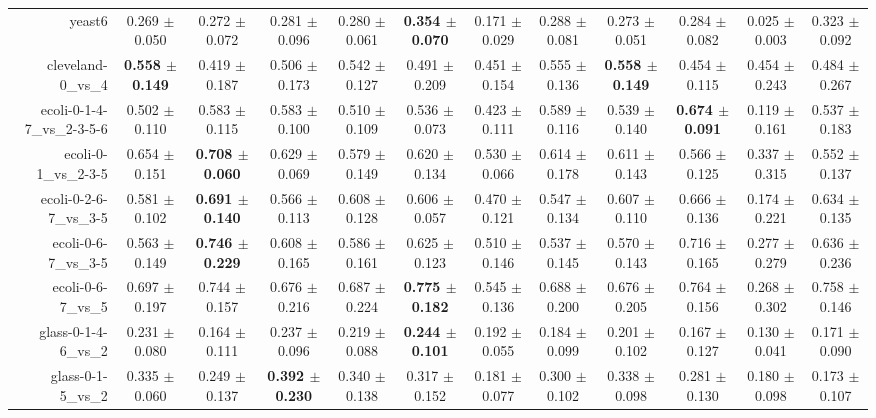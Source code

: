 \begin{table}[!ht]
{\begin{tabular}{r c c c c c c c c c c c}
yeast6 & 0.269 $\pm$ 0.050 & 0.272 $\pm$ 0.072 & 0.281 $\pm$ 0.096 & 0.280 $\pm$ 0.061 & \textbf{0.354 $\pm$ 0.070} & 0.171 $\pm$ 0.029 & 0.288 $\pm$ 0.081 & 0.273 $\pm$ 0.051 & 0.284 $\pm$ 0.082 & 0.025 $\pm$ 0.003 & 0.323 $\pm$ 0.092 \\
cleveland-0\_vs\_4 & \textbf{0.558 $\pm$ 0.149} & 0.419 $\pm$ 0.187 & 0.506 $\pm$ 0.173 & 0.542 $\pm$ 0.127 & 0.491 $\pm$ 0.209 & 0.451 $\pm$ 0.154 & 0.555 $\pm$ 0.136 & \textbf{0.558 $\pm$ 0.149} & 0.454 $\pm$ 0.115 & 0.454 $\pm$ 0.243 & 0.484 $\pm$ 0.267 \\
ecoli-0-1-4-7\_vs\_2-3-5-6 & 0.502 $\pm$ 0.110 & 0.583 $\pm$ 0.115 & 0.583 $\pm$ 0.100 & 0.510 $\pm$ 0.109 & 0.536 $\pm$ 0.073 & 0.423 $\pm$ 0.111 & 0.589 $\pm$ 0.116 & 0.539 $\pm$ 0.140 & \textbf{0.674 $\pm$ 0.091} & 0.119 $\pm$ 0.161 & 0.537 $\pm$ 0.183 \\
ecoli-0-1\_vs\_2-3-5 & 0.654 $\pm$ 0.151 & \textbf{0.708 $\pm$ 0.060} & 0.629 $\pm$ 0.069 & 0.579 $\pm$ 0.149 & 0.620 $\pm$ 0.134 & 0.530 $\pm$ 0.066 & 0.614 $\pm$ 0.178 & 0.611 $\pm$ 0.143 & 0.566 $\pm$ 0.125 & 0.337 $\pm$ 0.315 & 0.552 $\pm$ 0.137 \\
ecoli-0-2-6-7\_vs\_3-5 & 0.581 $\pm$ 0.102 & \textbf{0.691 $\pm$ 0.140} & 0.566 $\pm$ 0.113 & 0.608 $\pm$ 0.128 & 0.606 $\pm$ 0.057 & 0.470 $\pm$ 0.121 & 0.547 $\pm$ 0.134 & 0.607 $\pm$ 0.110 & 0.666 $\pm$ 0.136 & 0.174 $\pm$ 0.221 & 0.634 $\pm$ 0.135 \\
ecoli-0-6-7\_vs\_3-5 & 0.563 $\pm$ 0.149 & \textbf{0.746 $\pm$ 0.229} & 0.608 $\pm$ 0.165 & 0.586 $\pm$ 0.161 & 0.625 $\pm$ 0.123 & 0.510 $\pm$ 0.146 & 0.537 $\pm$ 0.145 & 0.570 $\pm$ 0.143 & 0.716 $\pm$ 0.165 & 0.277 $\pm$ 0.279 & 0.636 $\pm$ 0.236 \\
ecoli-0-6-7\_vs\_5 & 0.697 $\pm$ 0.197 & 0.744 $\pm$ 0.157 & 0.676 $\pm$ 0.216 & 0.687 $\pm$ 0.224 & \textbf{0.775 $\pm$ 0.182} & 0.545 $\pm$ 0.136 & 0.688 $\pm$ 0.200 & 0.676 $\pm$ 0.205 & 0.764 $\pm$ 0.156 & 0.268 $\pm$ 0.302 & 0.758 $\pm$ 0.146 \\
glass-0-1-4-6\_vs\_2 & 0.231 $\pm$ 0.080 & 0.164 $\pm$ 0.111 & 0.237 $\pm$ 0.096 & 0.219 $\pm$ 0.088 & \textbf{0.244 $\pm$ 0.101} & 0.192 $\pm$ 0.055 & 0.184 $\pm$ 0.099 & 0.201 $\pm$ 0.102 & 0.167 $\pm$ 0.127 & 0.130 $\pm$ 0.041 & 0.171 $\pm$ 0.090 \\
glass-0-1-5\_vs\_2 & 0.335 $\pm$ 0.060 & 0.249 $\pm$ 0.137 & \textbf{0.392 $\pm$ 0.230} & 0.340 $\pm$ 0.138 & 0.317 $\pm$ 0.152 & 0.181 $\pm$ 0.077 & 0.300 $\pm$ 0.102 & 0.338 $\pm$ 0.098 & 0.281 $\pm$ 0.130 & 0.180 $\pm$ 0.098 & 0.173 $\pm$ 0.107 \\

\end{tabular}}
\end{table}
